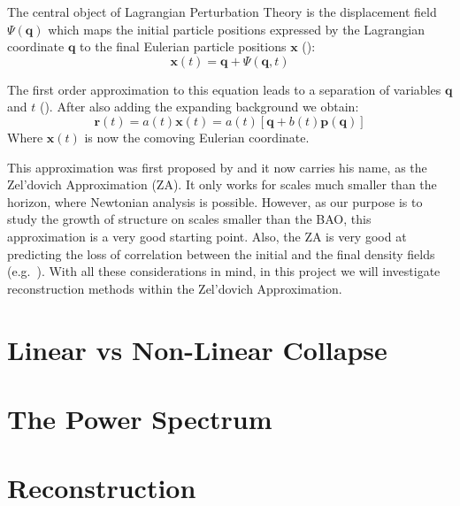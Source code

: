 The central object of Lagrangian Perturbation Theory is the displacement field $\Psi(\textbf{q})$ which maps the initial particle positions expressed by the Lagrangian coordinate $\textbf{q}$ to the final Eulerian particle positions $\textbf{x}$ (\cite{Bernardeau_PT}):
\begin{equation}
     \textbf{x}(t) = \textbf{q} + \Psi(\textbf{q}, t)
\end{equation}

The first order approximation to this equation leads to a separation of variables $\textbf{q}$ and $t$ (\cite{1993sfu..book.....P}). After also adding the expanding background we obtain:
\begin{equation}
    \textbf{r}(t) = a(t) \textbf{x}(t) = a(t) [\textbf{q} + b(t) \textbf{p}(\textbf{q})]
    \label{eq:2.2}
\end{equation}
Where $\textbf{x}(t)$ is now the comoving Eulerian coordinate.

This approximation was first proposed by \cite{1970A&A.....5...84Z} and it now carries his name, as the Zel'dovich Approximation (ZA). It only works for scales much smaller than the horizon, where Newtonian analysis is possible. However, as our purpose is to study the growth of structure on scales smaller than the BAO, this approximation is a very good starting point. Also, the ZA is very good at predicting the loss of correlation between the initial and the final density fields (e.g.~\cite{2016PhRvD..93j3519P}). With all these considerations in mind, in this project we will investigate reconstruction methods within the Zel'dovich Approximation.

\section{Linear vs Non-Linear Collapse}


\section{The Power Spectrum}

\section{Reconstruction}

